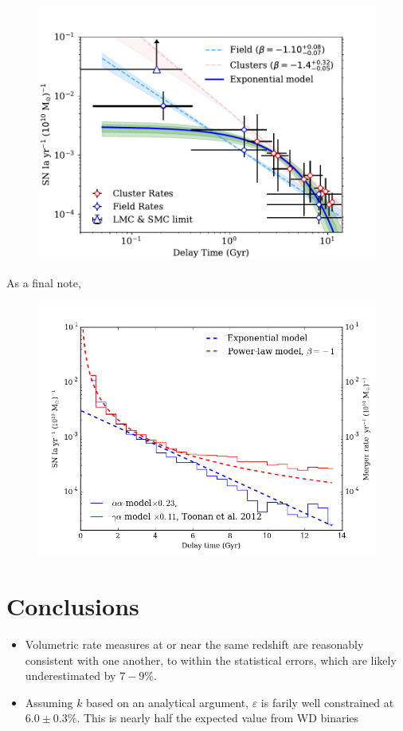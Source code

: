 \documentclass[apj]{aastex62}
\begin{document}
\begin{figure}[t] %
   \centering
   \includegraphics[width=6.5in]{figure_loglog_dtd}
   \caption{\footnotesize }
   \label{fig:logsnrate}
\end{figure}

As a final note, 

\begin{figure}[t] %
   \centering
   \includegraphics[width=6.5in]{figure_toonan}
   \caption{\footnotesize }
   \label{fig:toonan}
\end{figure}

\section{Conclusions}
\begin{itemize}
	\item Volumetric rate measures at or near the same redshift are reasonably consistent with one another, to within the statistical errors, which are likely underestimated by $7-9\%$.
	\item  Assuming $k$ based on an analytical argument, $\varepsilon$ is farily well constrained at $6.0\pm0.3\%$. This is nearly half the expected value from WD binaries~\citep{Maoz:2017zl}

\end{itemize}
\end{document}
